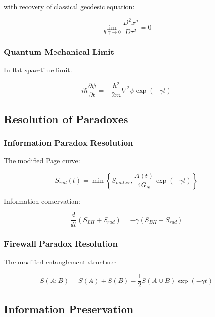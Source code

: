 \documentclass[12pt]{article}
\theoremstyle{plain}
\theoremstyle{definition}
\theoremstyle{remark}
\begin{document}
with recovery of classical geodesic equation:

\begin{equation}
\lim_{\hbar,\gamma \to 0} \frac{D^2x^\mu}{D\tau^2} = 0
\end{equation}

\subsubsection{Quantum Mechanical Limit}

In flat spacetime limit:

\begin{equation}
i\hbar\frac{\partial\psi}{\partial t} = -\frac{\hbar^2}{2m}\nabla^2\psi\exp(-\gamma t)
\end{equation}

\subsection{Resolution of Paradoxes}

\subsubsection{Information Paradox Resolution}

The modified Page curve:

\begin{equation}
S_{rad}(t) = \min\left\{S_{matter}, \frac{A(t)}{4G_N}\exp(-\gamma t)\right\}
\end{equation}

Information conservation:

\begin{equation}
\frac{d}{dt}(S_{BH} + S_{rad}) = -\gamma(S_{BH} + S_{rad})
\end{equation}

\subsubsection{Firewall Paradox Resolution}

The modified entanglement structure:

\begin{equation}
S(A:B) = S(A) + S(B) - \frac{1}{2}S(A \cup B)\exp(-\gamma t)
\end{equation}

\subsection{Information Preservation}
\end{document}
